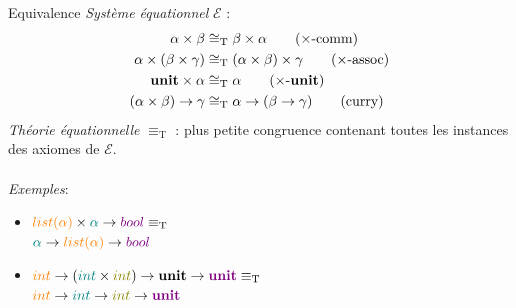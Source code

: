 \documentclass[serif]{beamer}
\newcommand{\exemples}{\textit{Exemples}\xspace}
\newcommand{\unit}{\bold{unit}}
\newcommand{\E}{\mathscr{E}}
\newcommand{\T}{\mathrm{T}}
\begin{document}
\begin{frame}{Equivalence}
\small
\emph{Système équationnel} $\E$ :
\begin{align}
    \alpha \times \beta &\cong_\T
    \beta \times \alpha
    \label{prod_comm}
    \tag{$\times$-comm}
  \\
    \alpha \times (\beta \times \gamma) &\cong_\T
    (\alpha \times \beta) \times \gamma
    \label{prod_assoc}
    \tag{$\times$-assoc}
  \\
    \unit \times \alpha &\cong_\T
    \alpha
    \label{prod_unit}
    \tag{$\times$-$\unit$}
  \\
    (\alpha \times \beta) \rightarrow \gamma &\cong_\T
    \alpha \rightarrow (\beta \rightarrow \gamma)
    \label{curry}
    \tag{curry}
\end{align}
\emph{Théorie équationnelle} $\equiv_\T$ : plus petite congruence contenant toutes les instances des axiomes de $\E$.
\\~\\
\exemples :
\begin{itemize}
  \item
    $\textcolor{orange}{list (\alpha)} \times \textcolor{teal}{\alpha} \rightarrow \textcolor{violet}{bool} \equiv_\T$ \\
    $\textcolor{teal}{\alpha} \rightarrow \textcolor{orange}{list (\alpha)} \rightarrow \textcolor{violet}{bool}$
  \item
    $\textcolor{orange}{int} \rightarrow (\textcolor{teal}{int} \times \textcolor{olive}{int}) \rightarrow \unit \rightarrow \textcolor{violet}{\unit} \equiv_\T$ \\
    $\textcolor{orange}{int} \rightarrow \textcolor{teal}{int} \rightarrow \textcolor{olive}{int} \rightarrow \textcolor{violet}{\unit}$
\end{itemize}
\end{frame}

\end{document}
